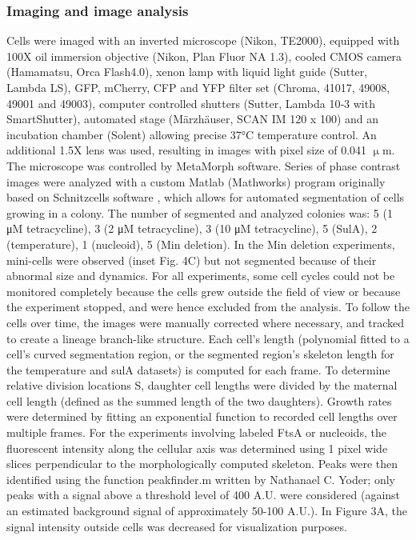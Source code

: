\subsubsection{Imaging and image analysis}
Cells were imaged with an inverted microscope (Nikon, TE2000), equipped with 100X oil immersion objective (Nikon, Plan Fluor NA 1.3), cooled CMOS camera (Hamamatsu, Orca Flash4.0), xenon lamp with liquid light guide (Sutter, Lambda LS), GFP, mCherry, CFP and YFP filter set (Chroma, 41017, 49008, 49001 and 49003), computer controlled shutters (Sutter, Lambda 10‐3 with SmartShutter), automated stage (Märzhäuser, SCAN IM 120 x 100) and an incubation chamber (Solent) allowing precise 37°C temperature control. An additional 1.5X lens was used, resulting in images with pixel size of 0.041 $\upmu$m. The microscope was controlled by MetaMorph software. Series of phase contrast images were analyzed with a custom Matlab (Mathworks) program originally based on Schnitzcells software \cite{Young2012}, which allows for automated segmentation of cells growing in a colony. The number of segmented and analyzed colonies was: 5 (1 μM tetracycline), 3 (2 μM tetracycline), 3 (10 μM tetracycline), 5 (SulA), 2 (temperature), 1 (nucleoid), 5 (Min deletion). In the Min deletion experiments, mini-cells were observed (inset Fig. 4C) but not segmented because of their abnormal size and dynamics. For all experiments, some cell cycles could not be monitored completely because the cells grew outside the field of view or because the experiment stopped, and were hence excluded from the analysis. To follow the cells over time, the images were manually corrected where necessary, and tracked to create a lineage branch-like structure. Each cell’s length (polynomial fitted to a cell’s curved segmentation region, or the segmented region's skeleton length for the temperature and sulA datasets) is computed for each frame. To determine relative division locations S, daughter cell lengths were divided by the maternal cell length (defined as the summed length of the two daughters). Growth rates were determined by fitting an exponential function to recorded cell lengths over multiple frames. For the experiments involving labeled FtsA or nucleoids, the fluorescent intensity along the cellular axis was determined using 1 pixel wide slices perpendicular to the morphologically computed skeleton. Peaks were then identified using the function peakfinder.m written by Nathanael C. Yoder; only peaks with a signal above a threshold level of 400 A.U. were considered (against an estimated background signal of approximately 50-100 A.U.). In Figure 3A, the signal intensity outside cells was decreased for visualization purposes.

